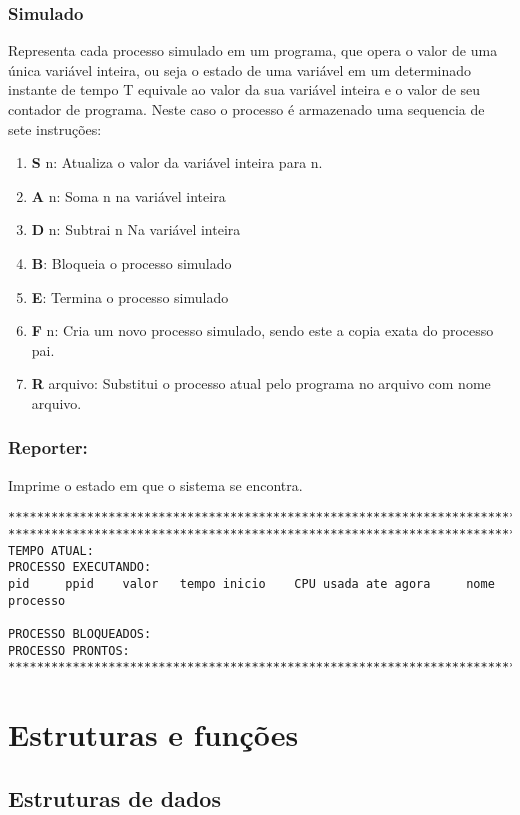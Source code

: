 \documentclass[a4paper, 12pt]{article}
\begin{document}
\subsubsection{Simulado} Representa cada processo simulado em um programa, que opera o valor de uma única variável inteira, ou seja o estado de uma variável em um determinado instante de tempo T equivale ao valor da sua variável inteira e o valor de seu contador de programa. Neste caso o processo é armazenado uma sequencia de sete instruções:
\begin{enumerate}
\item \textbf{S} n: Atualiza o valor da variável inteira para n.
\item \textbf{A} n: Soma n na variável inteira
\item \textbf{D} n: Subtrai n Na variável inteira
\item \textbf{B}: Bloqueia o processo simulado
\item \textbf{E}: Termina o processo simulado
\item \textbf{F} n: Cria um novo processo simulado, sendo este a copia exata do processo pai.
\item \textbf{R} arquivo: Substitui o processo atual pelo programa no arquivo com nome arquivo.
\end{enumerate}

\subsubsection{Reporter:} Imprime o estado em que o sistema se encontra.
\begin{footnotesize}
\begin{verbatim}
*****************************************************************************
*****************************************************************************
TEMPO ATUAL: 
PROCESSO EXECUTANDO:
pid     ppid    valor   tempo inicio    CPU usada ate agora     nome processo

PROCESSO BLOQUEADOS:
PROCESSO PRONTOS:
*****************************************************************************
\end{verbatim}
\end{footnotesize}
\newpage
\section{Estruturas e funções}
\subsection{Estruturas de dados}
\end{document}
